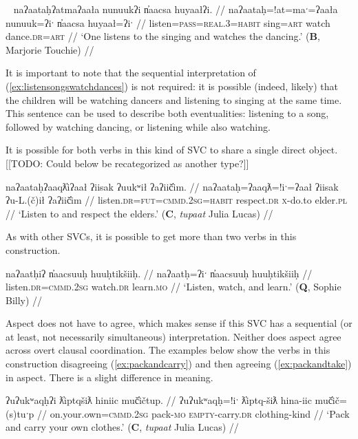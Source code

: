 \ex~ \label{ex:listensongswatchdances}
\begingl
\glpreamble naʔaataḥʔatmaʔaała nunuukʔi n̓aacsa huyaałʔi. //
\gla naʔaataḥ=!at=maˑ=ʔaała nunuuk=ʔiˑ n̓aacsa huyaał=ʔiˑ //
\glb listen=\textsc{pass}=\textsc{real.3}=\textsc{habit} sing=\textsc{art} watch dance.\textsc{dr}=\textsc{art} //
\glft `One listens to the singing and watches the dancing.' (\textbf{B}, Marjorie Touchie) //
\endgl
\xe

It is important to note that the sequential interpretation of (\ref{ex:listensongswatchdances}) is not required: it is possible (indeed, likely) that the children will be watching dancers and listening to singing at the same time. This sentence can be used to describe both eventualities: listening to a song, followed by watching dancing, or listening while also watching.

It is possible for both verbs in this kind of SVC to share a single direct object. [[TODO: Could below be recategorized as another type?]]

\ex \label{ex:listenrespect}
\begingl
\glpreamble naʔaataḥʔaaqƛ̓iʔaał ʔiisak ʔuukʷił ʔaʔiič̓im. //
\gla naʔaataḥ=ʔaaqƛ=!iˑ=ʔaał ʔiisak ʔu-L.(č)ił ʔaʔiič̓im //
\glb listen.\textsc{dr}=\textsc{fut}=\textsc{cmmd.2sg}=\textsc{habit} respect.\textsc{dr} \textsc{x}-do.to elder.\textsc{pl} //
\glft `Listen to and respect the elders.' (\textbf{C}, \textit{tupaat} Julia Lucas) //
\endgl
\xe


As with other SVCs, it is possible to get more than two verbs in this construction.

\ex \label{ex:listenwtachlearn}
\begingl
\glpreamble naʔaatḥiʔ n̓aacsuuḥ huuḥtikšiiḥ. //
\gla naʔaatḥ=ʔiˑ n̓aacsuuḥ huuḥtikšiiḥ //
\glb listen.\textsc{dr}=\textsc{cmmd.2sg} watch.\textsc{dr} learn.\textsc{mo} //
\glft `Listen, watch, and learn.' (\textbf{Q}, Sophie Billy) //
\endgl
\xe

Aspect does not have to agree, which makes sense if this SVC has a sequential (or at least, not necessarily simultaneous) interpretation. Neither does aspect agree across overt clausal coordination. The examples below show the verbs in this construction disagreeing (\ref{ex:packandcarry}) and then agreeing (\ref{ex:packandtake}) in aspect. There is a slight difference in meaning.

\ex \label{ex:packandcarry}
\begingl
\glpreamble ʔuʔukʷaqḥʔi ƛ̓iptqšiƛ hiniic muč̓ičtup. //
\gla ʔuʔukʷaqḥ=!iˑ ƛ̓iptq-šiƛ hina-iic muč̓ič=(s)tuˑp //
\glb on.your.own=\textsc{cmmd.2sg} pack-\textsc{mo} \textsc{empty}-carry.\textsc{dr} clothing-kind //
\glft `Pack and carry your own clothes.' (\textbf{C}, \textit{tupaat} Julia Lucas) //
\endgl
\xe

